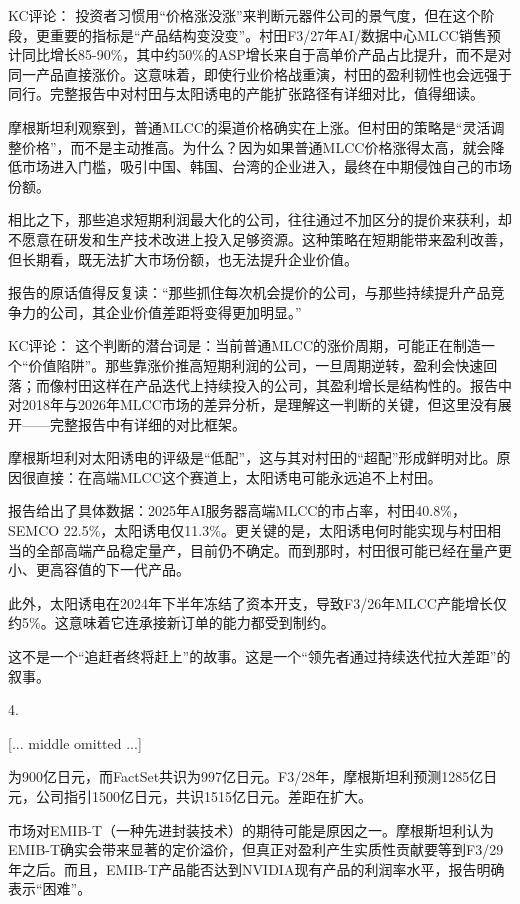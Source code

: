 \documentclass[11pt]{ctexart}
\begin{document}
KC评论： 投资者习惯用“价格涨没涨”来判断元器件公司的景气度，但在这个阶段，更重要的指标是“产品结构变没变”。村田F3/27年AI/数据中心MLCC销售预计同比增长85-90\%，其中约50\%的ASP增长来自于高单价产品占比提升，而不是对同一产品直接涨价。这意味着，即使行业价格战重演，村田的盈利韧性也会远强于同行。完整报告中对村田与太阳诱电的产能扩张路径有详细对比，值得细读。

摩根斯坦利观察到，普通MLCC的渠道价格确实在上涨。但村田的策略是“灵活调整价格”，而不是主动推高。为什么？因为如果普通MLCC价格涨得太高，就会降低市场进入门槛，吸引中国、韩国、台湾的企业进入，最终在中期侵蚀自己的市场份额。

相比之下，那些追求短期利润最大化的公司，往往通过不加区分的提价来获利，却不愿意在研发和生产技术改进上投入足够资源。这种策略在短期能带来盈利改善，但长期看，既无法扩大市场份额，也无法提升企业价值。

报告的原话值得反复读：“那些抓住每次机会提价的公司，与那些持续提升产品竞争力的公司，其企业价值差距将变得更加明显。”

KC评论： 这个判断的潜台词是：当前普通MLCC的涨价周期，可能正在制造一个“价值陷阱”。那些靠涨价推高短期利润的公司，一旦周期逆转，盈利会快速回落；而像村田这样在产品迭代上持续投入的公司，其盈利增长是结构性的。报告中对2018年与2026年MLCC市场的差异分析，是理解这一判断的关键，但这里没有展开——完整报告中有详细的对比框架。

摩根斯坦利对太阳诱电的评级是“低配”，这与其对村田的“超配”形成鲜明对比。原因很直接：在高端MLCC这个赛道上，太阳诱电可能永远追不上村田。

报告给出了具体数据：2025年AI服务器高端MLCC的市占率，村田40.8\%，SEMCO 22.5\%，太阳诱电仅11.3\%。更关键的是，太阳诱电何时能实现与村田相当的全部高端产品稳定量产，目前仍不确定。而到那时，村田很可能已经在量产更小、更高容值的下一代产品。

此外，太阳诱电在2024年下半年冻结了资本开支，导致F3/26年MLCC产能增长仅约5\%。这意味着它连承接新订单的能力都受到制约。

这不是一个“追赶者终将赶上”的故事。这是一个“领先者通过持续迭代拉大差距”的叙事。

4. 

[... middle omitted ...]

为900亿日元，而FactSet共识为997亿日元。F3/28年，摩根斯坦利预测1285亿日元，公司指引1500亿日元，共识1515亿日元。差距在扩大。

市场对EMIB-T（一种先进封装技术）的期待可能是原因之一。摩根斯坦利认为EMIB-T确实会带来显著的定价溢价，但真正对盈利产生实质性贡献要等到F3/29年之后。而且，EMIB-T产品能否达到NVIDIA现有产品的利润率水平，报告明确表示“困难”。
\end{document}
